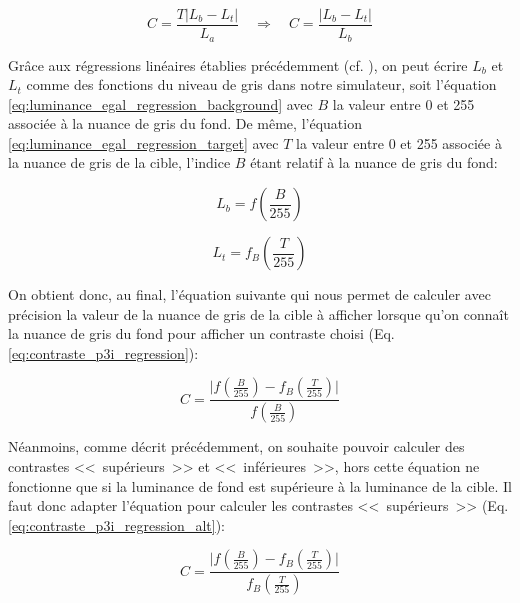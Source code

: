 	\begin{equation}
		C = \frac{T \vert L_b - L_t \vert}{L_a} \quad \Rightarrow \quad C = \frac{\vert L_b - L_t \vert}{L_b}
		\label{eq:contraste_p3i}
	\end{equation}
	
	\par Grâce aux régressions linéaires établies précédemment (cf. ), on peut écrire $L_b$ et $L_t$ comme des fonctions du niveau de gris dans notre simulateur, soit l'équation \ref{eq:luminance_egal_regression_background} avec $B$ la valeur entre 0 et 255 associée à la nuance de gris du fond. De même, l'équation \ref{eq:luminance_egal_regression_target} avec $T$ la valeur entre 0 et 255 associée à la nuance de gris de la cible, l'indice $B$ étant relatif à la nuance de gris du fond:
	
	\begin{equation}
		L_b = f\left( \frac{B}{255} \right)
		\label{eq:luminance_egal_regression_background}
	\end{equation}
	
	\begin{equation}
		L_t = f_B\left( \frac{T}{255} \right)
		\label{eq:luminance_egal_regression_target}
	\end{equation}
	
	\par On obtient donc, au final, l'équation suivante qui nous permet de calculer avec précision la valeur de la nuance de gris de la cible à afficher lorsque qu'on connaît la nuance de gris du fond pour afficher un contraste choisi (Eq. \ref{eq:contraste_p3i_regression}):
	
	\begin{equation}
		C = \frac{\vert f\left( \frac{B}{255} \right) - f_B\left( \frac{T}{255} \right) \vert}{f\left( \frac{B}{255} \right)}
		\label{eq:contraste_p3i_regression}
	\end{equation}
	
	\par Néanmoins, comme décrit précédemment, on souhaite pouvoir calculer des contrastes <<~supérieurs~>> et <<~inférieures~>>, hors cette équation ne fonctionne que si la luminance de fond est supérieure à la luminance de la cible. Il faut donc adapter l'équation pour calculer les contrastes <<~supérieurs~>> (Eq. \ref{eq:contraste_p3i_regression_alt}):
	
	\begin{equation}
		C = \frac{\vert f\left( \frac{B}{255} \right) - f_B\left( \frac{T}{255} \right) \vert}{f_B\left( \frac{T}{255} \right)}
		\label{eq:contraste_p3i_regression_alt}
	\end{equation}
	
